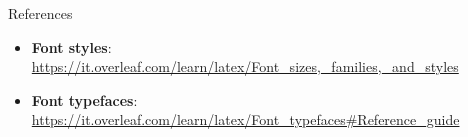 \begin{frame}{References}
    \begin{itemize}
        \item \textbf{Font styles}: \url{https://it.overleaf.com/learn/latex/Font\_sizes,\_families,\_and\_styles}
        
        \item \textbf{Font typefaces}: \url{https://it.overleaf.com/learn/latex/Font_typefaces\#Reference_guide}
    \end{itemize}
\end{frame}